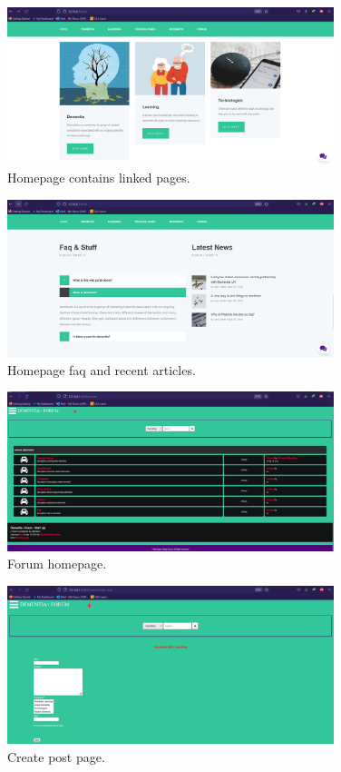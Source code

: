\begin{figure}[!h]
	\centering
	\includegraphics[width=0.85\textwidth]{home2}
	\caption{Homepage contains linked pages.}
	\label{fig:13}
\end{figure}

\begin{figure}[!h]
	\centering
	\includegraphics[width=0.85\textwidth]{home3}
	\caption{Homepage faq and recent articles.}
	\label{fig:14}
\end{figure}

\begin{figure}[!h]
	\centering
	\includegraphics[width=0.85\textwidth]{forum}
	\caption{Forum homepage.}
	\label{fig:15}
\end{figure}

\begin{figure}[!h]
	\centering
	\includegraphics[width=0.85\textwidth]{create_post}
	\caption{Create post page.}
	\label{fig:16}
\end{figure}


